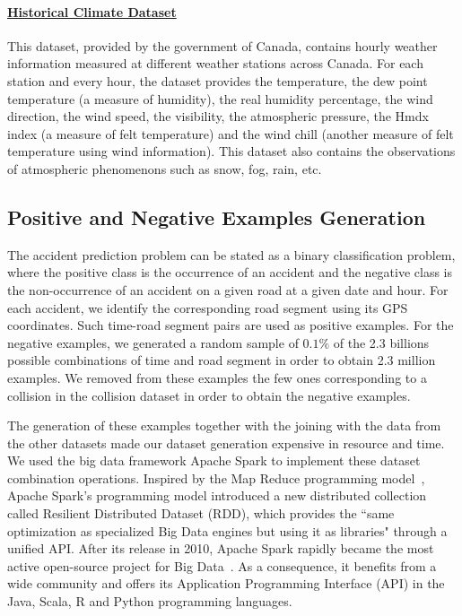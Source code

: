 \documentclass[conference]{IEEEtran}
\begin{document}
\paragraph{\href{http://climate.weather.gc.ca/}{Historical Climate Dataset}}

This dataset, provided by the government of Canada, contains hourly weather
information measured at different weather stations across Canada. For each
station and every hour, the dataset provides the temperature, the dew point
temperature (a measure of humidity), the real humidity percentage,
the wind direction, the wind speed, the visibility, the atmospheric pressure,
the Hmdx index (a measure of felt temperature) and the wind chill 
 (another measure of felt temperature using wind information).
This dataset also contains the observations of atmospheric phenomenons such
as snow, fog, rain, etc.

\subsection{Positive and Negative Examples Generation}

The accident prediction problem can be stated as a binary classification
problem, where the positive class is the occurrence of an accident and the
negative class is the non-occurrence of an accident on a given road at a
given date and hour. For each accident, we identify the
corresponding road segment using its GPS coordinates. Such time-road segment pairs are used as
positive examples. For the negative examples, we generated a random sample
of $0.1\%$ of the 2.3 billions possible combinations of time and road segment
in order to obtain 2.3 million examples. We removed from these examples the few
ones corresponding to a collision in the collision dataset in order to obtain
the negative examples.

The generation of these examples together with the
joining with the data from the other datasets made our dataset
generation expensive in resource and time. We used the big data framework
Apache Spark \cite{Zaharia2016} to implement these dataset combination
operations. Inspired by the Map Reduce programming model~\cite{mapreduce}, Apache Spark's programming model introduced a new distributed collection called Resilient Distributed Dataset (RDD), which provides the ``same optimization as specialized Big Data engines but using it as libraries" through a unified API. After its release in 2010, Apache Spark rapidly became the most active open-source project for Big Data~\cite{spark}. As a consequence, it benefits from a wide community and offers its Application Programming Interface (API) in the Java, Scala, R and Python programming languages. 
\end{document}
